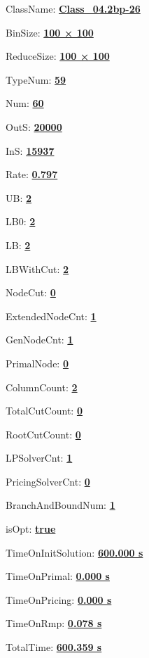 \documentclass[11pt]{article}
\begin{document}
\pagestyle{empty}


ClassName: \underline{\textbf{Class_04.2bp-26}}
\par
BinSize: \underline{\textbf{100 × 100}}
\par
ReduceSize: \underline{\textbf{100 × 100}}
\par
TypeNum: \underline{\textbf{59}}
\par
Num: \underline{\textbf{60}}
\par
OutS: \underline{\textbf{20000}}
\par
InS: \underline{\textbf{15937}}
\par
Rate: \underline{\textbf{0.797}}
\par
UB: \underline{\textbf{2}}
\par
LB0: \underline{\textbf{2}}
\par
LB: \underline{\textbf{2}}
\par
LBWithCut: \underline{\textbf{2}}
\par
NodeCut: \underline{\textbf{0}}
\par
ExtendedNodeCnt: \underline{\textbf{1}}
\par
GenNodeCnt: \underline{\textbf{1}}
\par
PrimalNode: \underline{\textbf{0}}
\par
ColumnCount: \underline{\textbf{2}}
\par
TotalCutCount: \underline{\textbf{0}}
\par
RootCutCount: \underline{\textbf{0}}
\par
LPSolverCnt: \underline{\textbf{1}}
\par
PricingSolverCnt: \underline{\textbf{0}}
\par
BranchAndBoundNum: \underline{\textbf{1}}
\par
isOpt: \underline{\textbf{true}}
\par
TimeOnInitSolution: \underline{\textbf{600.000 s}}
\par
TimeOnPrimal: \underline{\textbf{0.000 s}}
\par
TimeOnPricing: \underline{\textbf{0.000 s}}
\par
TimeOnRmp: \underline{\textbf{0.078 s}}
\par
TotalTime: \underline{\textbf{600.359 s}}
\par
\newpage
\end{document}
